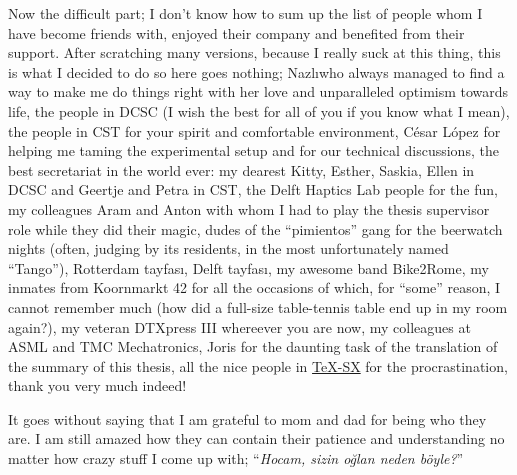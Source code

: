 Now the difficult part; I don't know how to sum up the list of people whom I have become friends with, enjoyed their company and benefited 
from their support. After scratching many versions, because I really suck at this thing, this is what I decided to do so here goes nothing; 
Nazl\i\space who always managed to find a way to make me do things right with her love and unparalleled optimism towards life, the people 
in DCSC (I wish the best for all of you if you know what I mean), the people in CST for your spirit and comfortable environment, C\'{e}sar 
L\'{o}pez for helping me taming the experimental setup and for our technical discussions, the best secretariat in the world ever: my dearest 
Kitty, Esther, Saskia, Ellen in DCSC and Geertje and Petra in CST, the Delft Haptics Lab people for the fun, my colleagues Aram and Anton 
with whom I had to play the thesis supervisor role while they did their magic, dudes of the \enquote{pimientos} 
gang for the beerwatch nights (often, judging by its residents, in the most unfortunately named \enquote{Tango}), Rotterdam tayfas\i, Delft 
tayfas\i, my awesome band Bike2Rome, my inmates from Koornmarkt 42 for all the occasions of which, for \enquote{some} reason, I cannot 
remember much (how did a full-size table-tennis table end up in my room again?), my veteran DTXpress III whereever you are now, my 
colleagues at ASML and TMC Mechatronics, Joris for the daunting task of the translation of the summary of this thesis, all the nice people 
in \href{http://tex.stackexchange.com}{\TeX-SX} for the procrastination, thank you very much indeed!


It goes without saying that I am grateful to mom and dad for being who they are. I am still amazed how they can contain their patience and 
understanding no matter how crazy stuff I come up with; \enquote{\emph{Hocam, sizin o\u{g}lan neden b\"{o}yle?}}